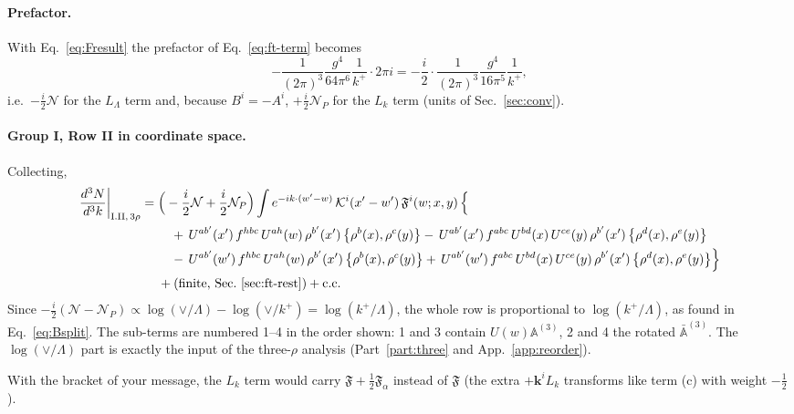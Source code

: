 \documentclass[10pt]{article}
\numberwithin{equation}{section}
\newcommand{\KK}{\mathcal K}
\newcommand{\NN}{\mathcal N}
\newcommand{\NP}{\mathcal N_{P}}
\newcommand{\bk}{\mathbf k}
\begin{document}
\paragraph{Prefactor.} With Eq.~\eqref{eq:Fresult} the prefactor of Eq.~\eqref{eq:ft-term} becomes
\begin{equation}
-\frac{1}{(2\pi)^3}\frac{g^4}{64\pi^6}\frac1{k^+}\cdot2\pi i=-\frac i2\cdot\frac{1}{(2\pi)^3}\frac{g^4}{16\pi^5}\frac1{k^+},
\end{equation}
i.e.\ $-\frac i2\NN$ for the $L_\Lambda$ term and, because $B^i=-A^i$, $+\frac i2\NP$ for the $L_k$ term (units of Sec.~\ref{sec:conv}).

\paragraph{Group I, Row II in coordinate space.} Collecting,
\begin{align}
\frac{d^3N}{d^3k}\bigg|_{\rm I.II,\,3\rho}={}&\Big(-\frac i2\NN+\frac i2\NP\Big)\int e^{-ik\cdot(w'-w)}\,\KK^i(x'-w')\,\mathfrak F^i(w;x,y)\,\Big\{\notag\\
&\quad +\,U^{ab'}(x')\,f^{hbc}\,U^{ah}(w)\,\rho^{b'}(x')\,\big\{\rho^{b}(x),\rho^{c}(y)\big\}
-\,U^{ab'}(x')\,f^{abc}\,U^{bd}(x)\,U^{ce}(y)\,\rho^{b'}(x')\,\big\{\rho^{d}(x),\rho^{e}(y)\big\}\notag\\
&\quad -\,U^{ab'}(w')\,f^{hbc}\,U^{ah}(w)\,\rho^{b'}(x')\,\big\{\rho^{b}(x),\rho^{c}(y)\big\}
+\,U^{ab'}(w')\,f^{abc}\,U^{bd}(x)\,U^{ce}(y)\,\rho^{b'}(x')\,\big\{\rho^{d}(x),\rho^{e}(y)\big\}\Big\}\notag\\
&+(\text{finite, Sec.~\ref{sec:ft-rest}})+{\rm c.c.}
\label{eq:RowIIcoord}
\end{align}
Since $-\frac i2(\NN-\NP)\propto\log(\vee/\Lambda)-\log(\vee/k^+)=\log(k^+/\Lambda)$, the whole row is proportional to $\log(k^+/\Lambda)$, as found in Eq.~\eqref{eq:Bsplit}. The sub-terms are numbered 1--4 in the order shown: 1 and 3 contain $U(w)\mathbb A^{(3)}$, 2 and 4 the rotated $\bar{\mathbb A}^{(3)}$. The $\log(\vee/\Lambda)$ part is exactly the input of the three-$\rho$ analysis (Part~\ref{part:three} and App.~\ref{app:reorder}).

With the bracket of your message, the $L_k$ term would carry $\mathfrak F+\frac12\mathfrak F_\alpha$ instead of $\mathfrak F$ (the extra $+\bk^iL_k$ transforms like term (c) with weight $-\frac12$).
\end{document}
